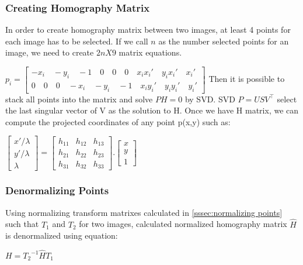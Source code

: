 \documentclass[letterpaper,12pt]{article}
\begin{document}
\subsubsection{Creating Homography Matrix}
In order to create homography matrix between two images, at least 4 points for each image has to be selected. If we call $n$ as the number selected points for an image, we need to create $2n X 9$ matrix equations.
\begin{center}
    

$p_i = \begin{bmatrix}
-x_i \quad -y_i \quad -1 \quad 0 \quad 0 \quad 0 \quad x_ix_i' \quad y_ix_i' \quad x_i' \\
0 \quad 0 \quad 0 \quad -x_i \quad -y_i \quad -1 \quad x_iy_i' \quad y_iy_i' \quad y_i'
\end{bmatrix}
$
\vspace{1em}
\newline
Then it is possible to stack all points into the matrix and solve $PH=0$ by SVD.
\newline
SVD $P = USV^\top$  select the last singular vector of V as the solution to H.
\vspace{250px}
\newline
Once we have H matrix, we can compute the projected coordinates of any point p(x,y) such as:

$\begin{bmatrix} \label{eq:hom_mul}
  x' / \lambda \\
  y' / \lambda \\
  \lambda
 \end{bmatrix} =
\begin{bmatrix}
  h_{11} & h_{12} & h_{13} \\
  h_{21} & h_{22} & h_{23} \\
  h_{31} & h_{32} & h_{33}
 \end{bmatrix}.
\begin{bmatrix}
  x \\
  y \\
  1
 \end{bmatrix}
$
\end{center}

\subsubsection{Denormalizing Points}
Using normalizing transform matrixes calculated in \ref{sssec:normalizing points} such that $T_1$ and $T_2$ for two images, calculated normalized homography matrix $\hat{H}$ is denormalized using equation:
\begin{center}
$ H= {T_2}^{-1} \hat{H} T_1$
\end{center}
\end{document}
